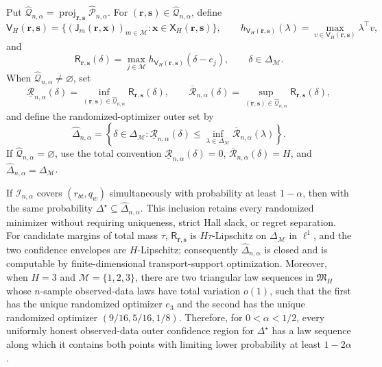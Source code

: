 Put \(\widehat{\mathcal Q}_{n,\alpha}=\operatorname{proj}_{\mathbf r,\mathbf s}\widehat{\mathcal P}_{n,\alpha}\).  For \((\mathbf r,\mathbf s)\in\widehat{\mathcal Q}_{n,\alpha}\), define
\[
 \mathsf V_H(\mathbf r,\mathbf s)
 =\{(\mathsf J_m(\mathbf r,\mathbf x))_{m\in\mathcal M}:
       \mathbf x\in\mathsf X_H(\mathbf r,\mathbf s)\},
 \qquad
 h_{\mathsf V_H(\mathbf r,\mathbf s)}(\lambda)
 =\max_{v\in\mathsf V_H(\mathbf r,\mathbf s)}\lambda^\top v,
\]
and
\[
 \mathsf R_{\mathbf r,\mathbf s}(\delta)
 =\max_{j\in\mathcal M}
   h_{\mathsf V_H(\mathbf r,\mathbf s)}(\delta-e_j),
 \qquad \delta\in\Delta_{\mathcal M}.
\]
When \(\widehat{\mathcal Q}_{n,\alpha}\ne\varnothing\), set
\[
 \underline{\mathcal R}_{n,\alpha}(\delta)
 =\inf_{(\mathbf r,\mathbf s)\in\widehat{\mathcal Q}_{n,\alpha}}
      \mathsf R_{\mathbf r,\mathbf s}(\delta),
 \qquad
 \overline{\mathcal R}_{n,\alpha}(\delta)
 =\sup_{(\mathbf r,\mathbf s)\in\widehat{\mathcal Q}_{n,\alpha}}
      \mathsf R_{\mathbf r,\mathbf s}(\delta),
\]
and define the randomized-optimizer outer set by
\[
 \widehat{\Delta}_{n,\alpha}
 =\left\{\delta\in\Delta_{\mathcal M}:
   \underline{\mathcal R}_{n,\alpha}(\delta)
   \le \inf_{\lambda\in\Delta_{\mathcal M}}
          \overline{\mathcal R}_{n,\alpha}(\lambda)\right\}.
\]
If \(\widehat{\mathcal Q}_{n,\alpha}=\varnothing\), use the total convention \(\underline{\mathcal R}_{n,\alpha}(\delta)=0\), \(\overline{\mathcal R}_{n,\alpha}(\delta)=H\), and \(\widehat{\Delta}_{n,\alpha}=\Delta_{\mathcal M}\).

If \(\mathcal I_{n,\alpha}\) covers \((r_{bt},q_w)\) simultaneously with probability at least \(1-\alpha\), then with the same probability \(\Delta^\star\subseteq\widehat{\Delta}_{n,\alpha}\).  This inclusion retains every randomized minimizer without requiring uniqueness, strict Hall slack, or regret separation.  For candidate margins of total mass \(\tau\), \(\mathsf R_{\mathbf r,\mathbf s}\) is \(H\tau\)-Lipschitz on \(\Delta_{\mathcal M}\) in \(\ell^1\), and the two confidence envelopes are \(H\)-Lipschitz; consequently \(\widehat{\Delta}_{n,\alpha}\) is closed and is computable by finite-dimensional transport-support optimization.  Moreover, when \(H=3\) and \(\mathcal M=\{1,2,3\}\), there are two triangular law sequences in \(\mathfrak M_H\) whose \(n\)-sample observed-data laws have total variation \(o(1)\), such that the first has the unique randomized optimizer \(e_3\) and the second has the unique randomized optimizer \((9/16,5/16,1/8)\).  Therefore, for \(0<\alpha<1/2\), every uniformly honest observed-data outer confidence region for \(\Delta^\star\) has a law sequence along which it contains both points with limiting lower probability at least \(1-2\alpha\).

